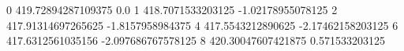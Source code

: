 0 419.72894287109375 0.0
1 418.7071533203125 -1.02178955078125
2 417.91314697265625 -1.8157958984375
4 417.5543212890625 -2.17462158203125
6 417.6312561035156 -2.097686767578125
8 420.30047607421875 0.571533203125
